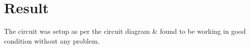 \chapter{Result}

The circuit was setup as per the circuit diagram \& found to be working in good condition without any problem.